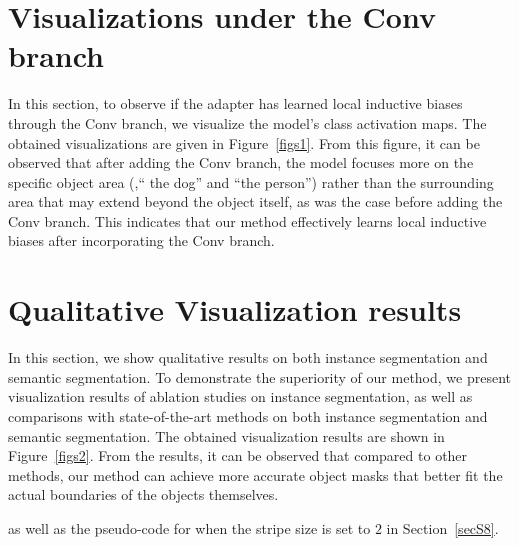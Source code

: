 \section{Visualizations under the Conv branch}
\label{secS6}
{} In this section, to observe if the adapter has learned local inductive biases through the Conv branch, we visualize the model's class activation maps. The obtained visualizations are given in Figure~\ref{figs1}. From this figure, it can be observed that after adding the Conv branch, the model focuses more on the specific object area (\eg,`` the dog'' and ``the person'') rather than the surrounding area that may extend beyond the object itself, as was the case before adding the Conv branch. This indicates that our method effectively learns local inductive biases after incorporating the Conv branch.


\section{Qualitative Visualization results}
\label{secS7}
{} In this section, we show qualitative results on both instance segmentation and semantic segmentation. To demonstrate the superiority of our method, we present visualization results of ablation studies on instance segmentation, as well as comparisons with state-of-the-art methods on both instance segmentation and semantic segmentation. 
% 
The obtained visualization results are shown in Figure~\ref{figs2}. From the results, it can be observed that compared to other methods, our method can achieve more accurate object masks that better fit the actual boundaries of the objects themselves.


as well as the pseudo-code for when the stripe size is set to $2$ in Section~\ref{secS8}. 
